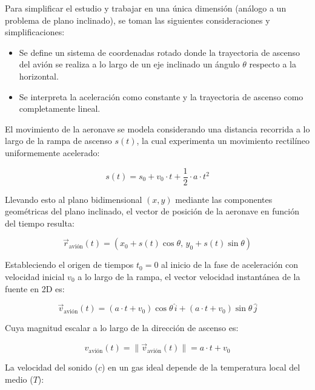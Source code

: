 \documentclass[10.5pt]{article}
\begin{document}
	Para simplificar el estudio y trabajar en una única dimensión (análogo a un problema de plano inclinado), se toman las siguientes consideraciones y simplificaciones:
	
	\begin{itemize}
		\item Se define un sistema de coordenadas rotado donde la trayectoria de ascenso del avión se realiza a lo largo de un eje inclinado un ángulo $\theta$ respecto a la horizontal.
		
		\item Se interpreta la aceleración como constante y la trayectoria de ascenso como completamente lineal.
	\end{itemize}
	
	El movimiento de la aeronave se modela considerando una distancia recorrida a lo largo de la rampa de ascenso $s(t)$, la cual experimenta un movimiento rectilíneo uniformemente acelerado:
	
	\begin{equation*}
		s(t) = s_0 + v_0 \cdot t + \frac{1}{2} \cdot a \cdot t^2
	\end{equation*}
	
	Llevando esto al plano bidimensional $(x, y)$ mediante las componentes geométricas del plano inclinado, el vector de posición de la aeronave en función del tiempo resulta:
	
	\begin{equation*}
		\vec{r}_{\text{avión}}(t) = \left( x_0 + s(t)\cos\theta, \, y_0 + s(t)\sin\theta \right)
	\end{equation*}
	
	Estableciendo el origen de tiempos $t_0 = 0$ al inicio de la fase de aceleración con velocidad inicial $v_0$ a lo largo de la rampa, el vector velocidad instantánea de la fuente en 2D es:
	
	\begin{equation*}
		\vec{v}_{\text{avión}}(t) = (a \cdot t + v_0)\cos\theta \, \hat{i} + (a \cdot t + v_0)\sin\theta \, \hat{j}
	\end{equation*}
	
	Cuya magnitud escalar a lo largo de la dirección de ascenso es:
	
	\begin{equation*}
		v_{\text{avión}}(t) = \|\vec{v}_{\text{avión}}(t)\| = a \cdot t + v_0
	\end{equation*}
	
	La velocidad del sonido ($c$) en un gas ideal depende de la temperatura local del medio ($T$):
	
\end{document}
